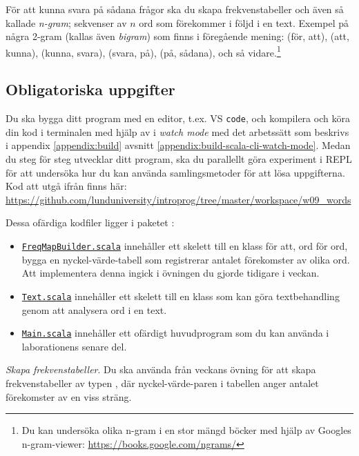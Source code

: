 \noindent För att kunna svara på sådana frågor ska du skapa frekvenstabeller och även så kallade \emph{n-gram}; sekvenser av $n$ ord som förekommer i följd i en text. Exempel på några 2-gram (kallas även \emph{bigram}) som finns i föregående mening: (för, att), (att, kunna), (kunna, svara), (svara, på), (på, sådana), och så vidare.\footnote{Du kan undersöka olika n-gram i en stor mängd böcker med hjälp av Googles n-gram-viewer: \url{https://books.google.com/ngrams/}}

\subsection{Obligatoriska uppgifter}

Du ska bygga ditt program med en editor, t.ex. VS \texttt{code}, och kompilera och köra din kod i terminalen med hjälp av  i \textit{watch mode} med det arbetssätt som beskrivs i appendix \ref{appendix:build} avsnitt \ref{appendix:build-scala-cli-watch-mode}. Medan du steg för steg utvecklar ditt program, ska du parallellt göra experiment i REPL för att undersöka hur du kan använda samlingsmetoder för att lösa uppgifterna.
Kod att utgå ifrån finns här: \url{https://github.com/lunduniversity/introprog/tree/master/workspace/w09_words}

Dessa ofärdiga kodfiler ligger i paketet :
\begin{itemize}
  \item \href{https://github.com/lunduniversity/introprog/blob/master/workspace/w09_words/FreqMapBuilder.scala}{\texttt{FreqMapBuilder.scala}} innehåller ett skelett till en klass för att, ord för ord, bygga en nyckel-värde-tabell som registrerar antalet förekomster av olika ord. Att implementera denna ingick i övningen du gjorde tidigare i veckan.

  \item \href{https://github.com/lunduniversity/introprog/blob/master/workspace/w09_words/Text.scala}{\texttt{Text.scala}} innehåller ett skelett till en klass som kan göra textbehandling genom att analysera ord i en text.

  \item \href{https://github.com/lunduniversity/introprog/blob/master/workspace/w09_words/Main.scala}{\texttt{Main.scala}} innehåller ett ofärdigt huvudprogram som du kan använda i laborationens senare del.
\end{itemize}

\Task \emph{Skapa frekvenstabeller}. Du ska använda  från veckans övning för att skapa frekvenstabeller av typen , där nyckel-värde-paren i tabellen anger antalet förekomster av en viss sträng.

